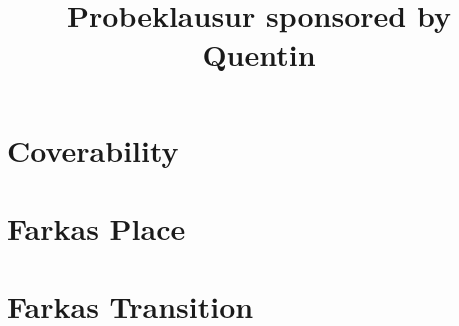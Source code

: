 \documentclass{article}
\title{Probeklausur sponsored by Quentin}
\begin{document}
\maketitle
\section{Coverability}

\section{Farkas Place}

\section{Farkas Transition}

\end{document}
